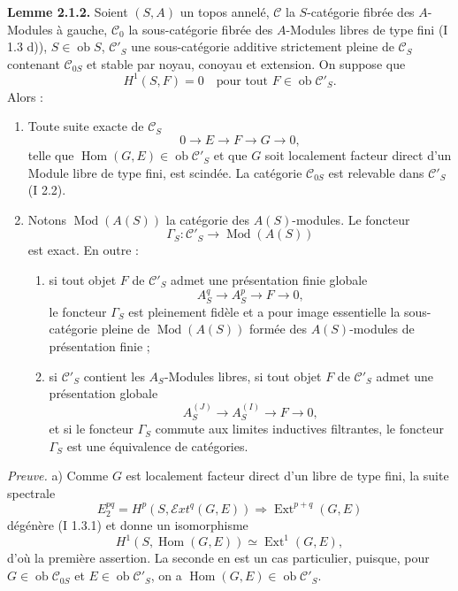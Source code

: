\documentclass[11pt]{article}
\providecommand{\Mod}{\operatorname{Mod}}
\providecommand{\Ext}{\operatorname{Ext}}
\providecommand{\Ob}{\operatorname{ob}}
\begin{document}
\textbf{Lemme 2.1.2.} Soient $(S,A)$ un topos annelé, $\mathcal C$ la $S$-catégorie fibrée des $A$-Modules à gauche, $\mathcal C_0$ la sous-catégorie fibrée des $A$-Modules libres de type fini (I 1.3 d)), $S\in\Ob S$, $\mathcal C'_S$ une sous-catégorie additive strictement pleine de $\mathcal C_S$ contenant $\mathcal C_{0S}$ et stable par noyau, conoyau et extension. On suppose que
\[
H^1(S,F)=0\quad\text{pour tout }F\in\Ob\mathcal C'_S.
\]
Alors :
\begin{enumerate}[label=\alph*)]
\item Toute suite exacte de $\mathcal C_S$
\[
0\longrightarrow E\longrightarrow F\longrightarrow G\longrightarrow0,
\]
telle que $\operatorname{Hom}(G,E)
\in\Ob\mathcal C'_S$ et que $G$ soit localement facteur direct d'un Module libre de type fini, est scindée. La catégorie $\mathcal C_{0S}$ est relevable dans $\mathcal C'_S$ (I 2.2).
\item Notons $\Mod(A(S))$ la catégorie des $A(S)$-modules. Le foncteur
\[
\Gamma_S:\mathcal C'_S\longrightarrow\Mod(A(S))
\]
est exact. En outre :
\begin{enumerate}[label=(\roman*)]
\item si tout objet $F$ de $\mathcal C'_S$ admet une présentation finie globale
\[
A_S^q\longrightarrow A_S^p\longrightarrow F\longrightarrow0,
\]
le foncteur $\Gamma_S$ est pleinement fidèle et a pour image essentielle la sous-catégorie pleine de $\Mod(A(S))$ formée des $A(S)$-modules de présentation finie ;
\item si $\mathcal C'_S$ contient les $A_S$-Modules libres, si tout objet $F$ de $\mathcal C'_S$ admet une présentation globale
\[
A_S^{(J)}\longrightarrow A_S^{(I)}\longrightarrow F\longrightarrow0,
\]
et si le foncteur $\Gamma_S$ commute aux limites inductives filtrantes, le foncteur $\Gamma_S$ est une équivalence de catégories.
\end{enumerate}
\end{enumerate}

\emph{Preuve.} a) Comme $G$ est localement facteur direct d'un libre de type fini, la suite spectrale
\[
E_2^{pq}=H^p(S,\mathcal{E}xt^q(G,E))\Longrightarrow\Ext^{p+q}(G,E)
\]
dégénère (I 1.3.1) et donne un isomorphisme
\[
H^1(S,\operatorname{Hom}(G,E))\simeq\Ext^1(G,E),
\]
d'où la première assertion. La seconde en est un cas particulier, puisque, pour $G\in\Ob\mathcal C_{0S}$ et $E\in\Ob\mathcal C'_S$, on a $\operatorname{Hom}(G,E)\in\Ob\mathcal C'_S$.
\end{document}
